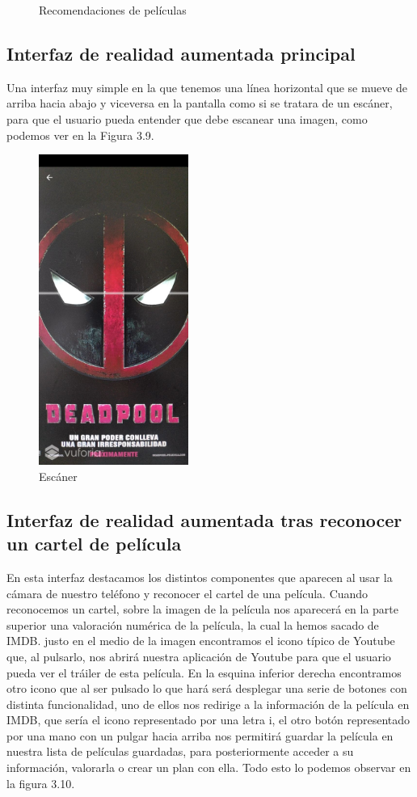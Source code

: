 \begin{figure}[H]
{\begin{minipage}[b]{0.5\linewidth}
      \caption{Recomendaciones de películas}
    \label{svb}
    \end{minipage}%
    }%
\end{figure}

\subsection{Interfaz de realidad aumentada principal}
\label{makereference3.4.4}
Una interfaz muy simple en la que tenemos una línea horizontal que se mueve de arriba hacia abajo y viceversa en la pantalla como si se tratara de un escáner, para que el usuario
pueda entender que debe escanear una imagen, como podemos ver en la Figura 3.9.
\begin{figure}[H]
    \centering
    \includegraphics[height=4in]{figures/escaner.jpg}
    \caption{Escáner}
\end{figure}
\subsection{Interfaz de realidad aumentada tras reconocer un cartel de película}
\label{makereference3.4.4}
En esta interfaz destacamos los distintos componentes que aparecen al usar la cámara de nuestro teléfono y reconocer el cartel de una película.
Cuando reconocemos un cartel, sobre la imagen de la película nos aparecerá en la parte superior una valoración numérica de la película, la cual la hemos 
sacado de IMDB. justo en el medio de la imagen encontramos el icono típico de Youtube que, al pulsarlo, nos abrirá nuestra aplicación de Youtube para que
el usuario pueda ver el tráiler de esta película. En la esquina inferior derecha encontramos otro icono que al ser pulsado lo que hará será desplegar una serie de botones con distinta funcionalidad,
uno de ellos nos redirige a la información de la película en IMDB, que sería el icono representado por una letra i, el otro botón representado por una mano con un pulgar hacia arriba nos permitirá
guardar la película en nuestra lista de películas guardadas, para posteriormente acceder a su información, valorarla o crear un plan con ella. Todo esto lo podemos observar en la figura 3.10.

